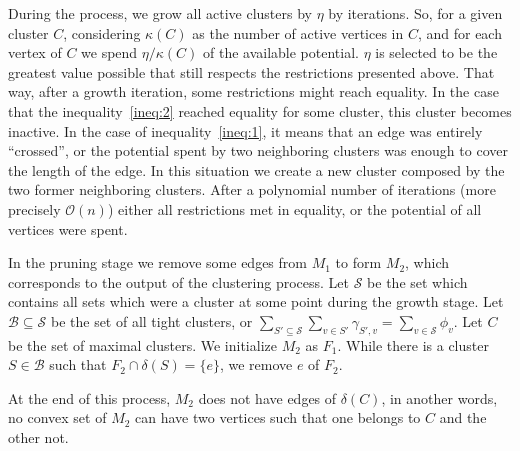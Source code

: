 During the process, we grow all active clusters by \(\eta\) by iterations. So, for a given cluster \(C\), considering \(\kappa(C)\) as the number of active vertices in \(C\), and for each vertex of \(C\) we spend \(\eta/\kappa(C)\) of the available potential. \(\eta\) is selected to be the greatest value possible that still respects the restrictions presented above. That way, after a growth iteration, some restrictions might reach equality. In the case that the inequality~\eqref{ineq:2} reached equality for some cluster, this cluster becomes inactive. In the case of inequality~\eqref{ineq:1}, it means that an edge was entirely ``crossed'', or the potential spent by two neighboring clusters was enough to cover the length of the edge. In this situation we create a new cluster composed by the two former neighboring clusters. After a polynomial number of iterations (more precisely \(\mathcal{O}(n)\)) either all restrictions met in equality, or the potential of all vertices were spent.

In the pruning stage we remove some edges from \(M_1\) to form \(M_2\), which corresponds to the output of the clustering process. Let \(\mathcal{S}\) be the set which contains all sets which were a cluster at some point during the growth stage. Let \(\mathcal{B} \subseteq \mathcal{S}\) be the set of all tight clusters, or \(\sum_{S' \subseteq \mathcal{S}} \sum_{v \in S'} \gamma_{S', v} = \sum_{v \in \mathcal{S}} \phi_v\). Let \(C\) be the set of maximal clusters. We initialize \(M_2\) as \(F_1\). While there is a cluster \(S \in \mathcal{B}\) such that \(F_2 \cap \delta(S) = \{e\}\), we remove \(e\) of \(F_2\).

At the end of this process, \(M_2\) does not have edges of \(\delta(C)\), in another words, no convex set of \(M_2\) can have two vertices such that one belongs to \(C\) and the other not.